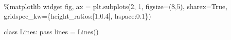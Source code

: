 \documentclass[
  letterpaper,
  DIV=11,
  numbers=noendperiod,
  oneside]{scrreprt}
\newenvironment{Shaded}{\begin{snugshade}}{\end{snugshade}}
\newcommand{\ControlFlowTok}[1]{\textcolor[rgb]{0.00,0.23,0.31}{#1}}
\newcommand{\DecValTok}[1]{\textcolor[rgb]{0.68,0.00,0.00}{#1}}
\newcommand{\FloatTok}[1]{\textcolor[rgb]{0.68,0.00,0.00}{#1}}
\newcommand{\KeywordTok}[1]{\textcolor[rgb]{0.00,0.23,0.31}{#1}}
\newcommand{\NormalTok}[1]{\textcolor[rgb]{0.00,0.23,0.31}{#1}}
\newcommand{\OperatorTok}[1]{\textcolor[rgb]{0.37,0.37,0.37}{#1}}
\newcommand{\StringTok}[1]{\textcolor[rgb]{0.13,0.47,0.30}{#1}}
\newcommand{\VariableTok}[1]{\textcolor[rgb]{0.07,0.07,0.07}{#1}}
\begin{document}
\begin{Shaded}
\begin{Highlighting}[]
\OperatorTok{\%}\NormalTok{matplotlib widget}
\NormalTok{fig, ax }\OperatorTok{=}\NormalTok{ plt.subplots(}\DecValTok{2}\NormalTok{, }\DecValTok{1}\NormalTok{, figsize}\OperatorTok{=}\NormalTok{(}\DecValTok{8}\NormalTok{,}\DecValTok{5}\NormalTok{), sharex}\OperatorTok{=}\VariableTok{True}\NormalTok{,}
\NormalTok{                       gridspec\_kw}\OperatorTok{=}\NormalTok{\{}\StringTok{\textquotesingle{}height\_ratios\textquotesingle{}}\NormalTok{:[}\DecValTok{1}\NormalTok{,}\FloatTok{0.4}\NormalTok{], }\StringTok{\textquotesingle{}hspace\textquotesingle{}}\NormalTok{:}\FloatTok{0.1}\NormalTok{\})}

\KeywordTok{class}\NormalTok{ Lines:}
    \ControlFlowTok{pass}
\NormalTok{lines }\OperatorTok{=}\NormalTok{ Lines()}


\end{Highlighting}
\end{Shaded}
\end{document}
